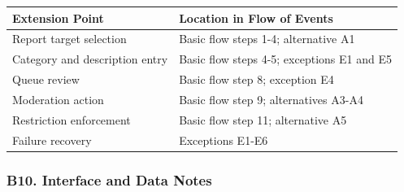 \documentclass[12pt]{article}
\renewcommand{\baselinestretch}{1.5}
\begin{document}
\begingroup
\small
\renewcommand{\baselinestretch}{1.0}\selectfont
\renewcommand{\arraystretch}{1.15}
\setlength{\tabcolsep}{6pt}
\begin{longtable}{|>{\raggedright\arraybackslash}p{}|>{\raggedright\arraybackslash}p{}|}
\hline
\textbf{Extension Point} & \textbf{Location in Flow of Events} \\ \hline
\endhead
Report target selection & Basic flow steps 1-4; alternative A1 \\ \hline
Category and description entry & Basic flow steps 4-5; exceptions E1 and E5 \\ \hline
Queue review & Basic flow step 8; exception E4 \\ \hline
Moderation action & Basic flow step 9; alternatives A3-A4 \\ \hline
Restriction enforcement & Basic flow step 11; alternative A5 \\ \hline
Failure recovery & Exceptions E1-E6 \\ \hline
\end{longtable}
\endgroup
\par\medskip

\hypertarget{sec:b10-interface-and-data-notes}{}
\subsubsection*{B10. Interface and Data Notes}
\par\medskip
\end{document}
